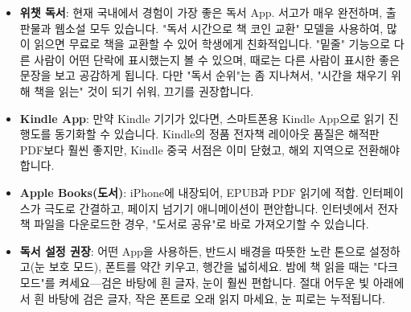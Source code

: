 \begin{itemize}
  \item \textbf{위챗 독서}: 현재 국내에서 경험이 가장 좋은 독서 App. 서고가 매우 완전하며, 출판물과 웹소설 모두 있습니다. "독서 시간으로 책 코인 교환" 모델을 사용하여, 많이 읽으면 무료로 책을 교환할 수 있어 학생에게 친화적입니다. "밑줄" 기능으로 다른 사람이 어떤 단락에 표시했는지 볼 수 있으며, 때로는 다른 사람이 표시한 좋은 문장을 보고 공감하게 됩니다. 다만 "독서 순위"는 좀 지나쳐서, "시간을 채우기 위해 책을 읽는" 것이 되기 쉬워, 끄기를 권장합니다.
  \item \textbf{Kindle App}: 만약 Kindle 기기가 있다면, 스마트폰용 Kindle App으로 읽기 진행도를 동기화할 수 있습니다. Kindle의 정품 전자책 레이아웃 품질은 해적판 PDF보다 훨씬 좋지만, Kindle 중국 서점은 이미 닫혔고, 해외 지역으로 전환해야 합니다.
  \item \textbf{Apple Books(도서)}: iPhone에 내장되어, EPUB과 PDF 읽기에 적합. 인터페이스가 극도로 간결하고, 페이지 넘기기 애니메이션이 편안합니다. 인터넷에서 전자책 파일을 다운로드한 경우, "도서로 공유"로 바로 가져오기할 수 있습니다.
  \item \textbf{독서 설정 권장}: 어떤 App을 사용하든, 반드시 배경을 따뜻한 노란 톤으로 설정하고(눈 보호 모드), 폰트를 약간 키우고, 행간을 넓히세요. 밤에 책 읽을 때는 "다크 모드"를 켜세요—검은 바탕에 흰 글자, 눈이 훨씬 편합니다. 절대 어두운 빛 아래에서 흰 바탕에 검은 글자, 작은 폰트로 오래 읽지 마세요, 눈 피로는 누적됩니다.
\end{itemize}


